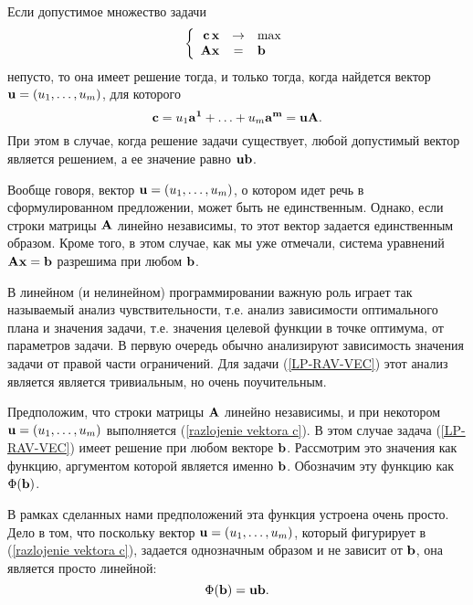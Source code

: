 \begin{prop}
    \label{fredgolm-1}
    Если допустимое множество задачи
\begin{equation*}
    \left\{
    \begin{array}{rcl}
     \mathbf{c} \, \mathbf{x} & \to & \max  \\
    \mathbf{A} \mathbf{x}& =& \mathbf{b} \\
     \end{array} \right.
\end{equation*}
    непусто, то
    она имеет решение тогда, и только тогда, когда найдется вектор
    $\mathbf{u}=(u_{1},\ldots,u_{m})$, для которого
\begin{equation*} \label{razlojenie vektora c}
    \mathbf{c}=u_{1}\mathbf{a^{1}}+\ldots+u_{m}\mathbf{a^{m}}=\mathbf{u}\mathbf{A}.
\end{equation*}
    При этом в случае, когда решение задачи
    существует, любой допустимый вектор является решением, а ее
    значение равно $\mathbf{u}\mathbf{b}$.
\end{prop}


    Вообще говоря, вектор $\mathbf{u}=(u_{1},\ldots,u_{m})$, о котором идет речь в
    сформулированном предложении, может быть не единственным.
    Однако, если строки матрицы $\mathbf{A}$ линейно независимы, то этот
    вектор задается единственным образом. Кроме того, в этом случае, как мы уже
    отмечали, система уравнений $\mathbf{A}\mathbf{x}=\mathbf{b}$ разрешима при
    любом $\mathbf{b}$.

    В линейном (и нелинейном) программировании важную роль
    играет так называемый анализ чувствительности, т.е. анализ
    зависимости оптимального плана и значения задачи, т.е. значения целевой функции
    в точке оптимума, от параметров задачи. В первую очередь
    обычно анализируют зависимость значения задачи от правой части
    ограничений. Для задачи (\ref{LP-RAV-VEC}) этот анализ является
    является тривиальным, но очень поучительным.

    Предположим, что строки матрицы $\mathbf{A}$ линейно независимы,  и
    при некотором $\mathbf{u}=(u_{1},\ldots,u_{m})$ выполняется
    (\ref{razlojenie vektora c}). В этом случае задача
    (\ref{LP-RAV-VEC}) имеет решение при любом векторе $\mathbf{b}$.
    Рассмотрим это значения как функцию, аргументом которой является
    именно $\mathbf{b}$. Обозначим эту функцию как $\Phi(\mathbf{b})$.


    В рамках сделанных нами предположений эта функция устроена очень
    просто. Дело в том, что поскольку вектор
    $\mathbf{u}=(u_{1},\ldots,u_{m})$, который фигурирует в
    (\ref{razlojenie vektora c}), задается однозначным образом и не
    зависит от $\mathbf{b}$, она является просто линейной:
    \[\Phi(\mathbf{b})=\mathbf{u}\mathbf{b}.\]

